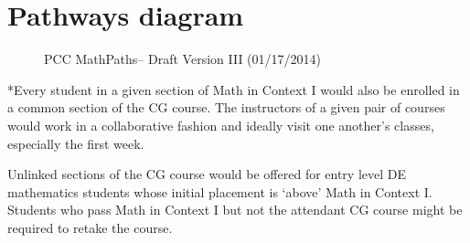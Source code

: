 \chapter{Pathways diagram}\label{app:sec:pathways}

\begin{figure}[!htb]
  \centering
  
  \caption{PCC MathPaths-- Draft Version III (01/17/2014)}
  \label{app:figure:pathways}
\end{figure}

*Every student in a given section of Math in Context I 
would also be enrolled in a common section of the CG 
course.  The instructors of a given pair of courses 
would work in a collaborative fashion and ideally visit 
one another's classes, especially the first week. 

Unlinked sections of the CG course would be offered 
for entry level DE mathematics students whose initial 
placement is `above' Math in Context I.  Students who 
pass Math in Context I but not the attendant CG course 
might be required to retake the course. 

